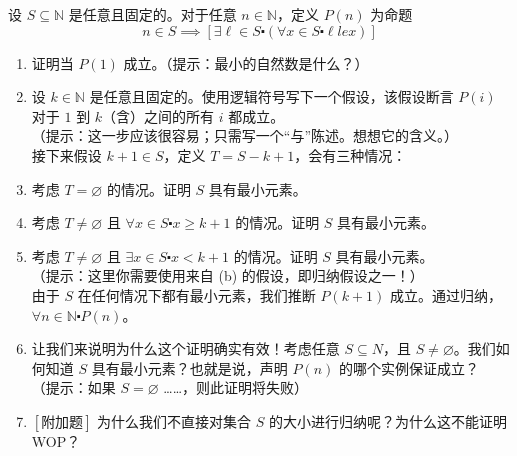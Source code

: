 \begin{exercise}
设 $S \subseteq \mathbb{N}$ 是任意且固定的。对于任意 $n \in \mathbb{N}$，定义 $P(n)$ 为命题
\[n \in S \implies [\exists \ell \in S \centerdot (\forall x \in S \centerdot \ell le x)]\]
\begin{enumerate}[label=(\alph*)]
    \item 证明当 $P(1)$ 成立。（提示：最小的自然数是什么？）
    \item 设 $k \in \mathbb{N}$ 是任意且固定的。使用逻辑符号写下一个假设，该假设断言 $P(i)$ 对于 $1$ 到 $k$（含）之间的所有 $i$ 都成立。 \\
    （提示：这一步应该很容易；只需写一个``与''陈述。想想它的含义。）\\
    接下来假设 $k + 1 \in S$，定义 $T = S - {k + 1}$，会有三种情况：
    \item 考虑 $T = \varnothing$ 的情况。证明 $S$ 具有最小元素。
    \item 考虑 $T \ne \varnothing$ 且 $\forall x \in S \centerdot x \ge k + 1$ 的情况。证明 $S$ 具有最小元素。
    \item 考虑 $T \ne \varnothing$ 且 $\exists x \in S \centerdot x < k + 1$ 的情况。证明 $S$ 具有最小元素。\\
    （提示：这里你需要使用来自 (b) 的假设，即归纳假设之一！）\\
    由于 $S$ 在任何情况下都有最小元素，我们推断 $P(k + 1)$ 成立。通过归纳，$\forall n \in \mathbb{N} \centerdot P(n)$。
    \item 让我们来说明为什么这个证明确实有效！考虑任意 $S \subseteq N$，且 $S \ne \varnothing$。我们如何知道 $S$ 具有最小元素？也就是说，声明 $P(n)$ 的哪个实例保证成立？\\
    （提示：如果 $S = \varnothing$ ……，则此证明将失败）
    \item $[\text{附加题}]$ 为什么我们不直接对集合 $S$ 的大小进行归纳呢？为什么这不能证明 WOP？
\end{enumerate}
\end{exercise}

